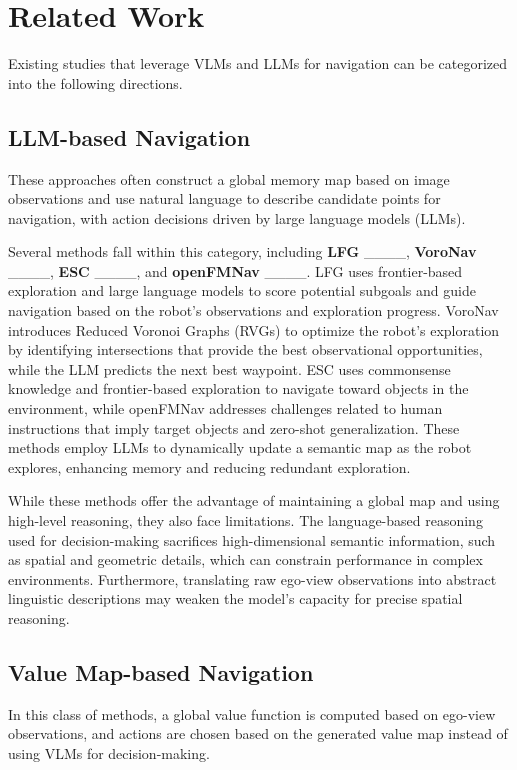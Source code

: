 \section{Related Work}
\label{related}
Existing studies that leverage VLMs and LLMs for navigation can be categorized into the following directions.

\subsection{LLM-based Navigation}
These approaches often construct a global memory map based on image observations and use natural language to describe candidate points for navigation, with action decisions driven by large language models (LLMs).

Several methods fall within this category, including \textbf{LFG} ____, \textbf{VoroNav} ____, \textbf{ESC} ____, and \textbf{openFMNav} ____. LFG uses frontier-based exploration and large language models to score potential subgoals and guide navigation based on the robot’s observations and exploration progress. VoroNav introduces Reduced Voronoi Graphs (RVGs) to optimize the robot’s exploration by identifying intersections that provide the best observational opportunities, while the LLM predicts the next best waypoint. ESC uses commonsense knowledge and frontier-based exploration to navigate toward objects in the environment, while openFMNav addresses challenges related to human instructions that imply target objects and zero-shot generalization. These methods employ LLMs to dynamically update a semantic map as the robot explores, enhancing memory and reducing redundant exploration.

While these methods offer the advantage of maintaining a global map and using high-level reasoning, they also face limitations. The language-based reasoning used for decision-making sacrifices high-dimensional semantic information, such as spatial and geometric details, which can constrain performance in complex environments. Furthermore, translating raw ego-view observations into abstract linguistic descriptions may weaken the model’s capacity for precise spatial reasoning.

\subsection{Value Map-based Navigation}
In this class of methods, a global value function is computed based on ego-view observations, and actions are chosen based on the generated value map instead of using VLMs for decision-making.


